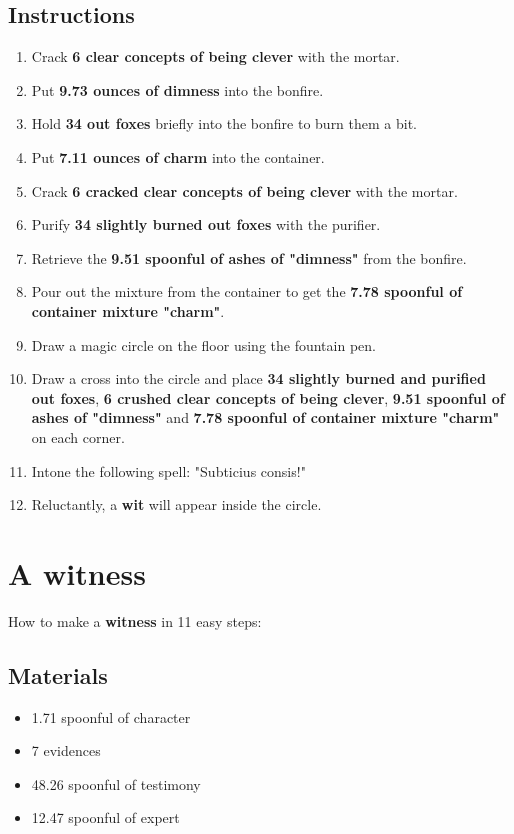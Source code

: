 \documentclass{article}
\begin{document}
\subsection{Instructions}\begin{enumerate}
\item 
Crack \textbf{6 clear concepts of being clever} with the mortar.
\item 
Put \textbf{9.73 ounces of dimness} into the bonfire.
\item 
Hold \textbf{34 out foxes} briefly into the bonfire to burn them a bit.
\item 
Put \textbf{7.11 ounces of charm} into the container.
\item 
Crack \textbf{6 cracked clear concepts of being clever} with the mortar.
\item 
Purify \textbf{34 slightly burned out foxes} with the purifier.
\item 
Retrieve the \textbf{9.51 spoonful of ashes of "dimness"} from the bonfire.
\item 
Pour out the mixture from the container to get the \textbf{7.78 spoonful of container mixture "charm"}.
\item 
Draw a magic circle on the floor using the fountain pen.
\item 
Draw a cross into the circle and place \textbf{34 slightly burned and purified out foxes}, \textbf{6 crushed clear concepts of being clever}, \textbf{9.51 spoonful of ashes of "dimness"} and \textbf{7.78 spoonful of container mixture "charm"} on each corner.
\item 
Intone the following spell: "Subticius consis!"
\item 
Reluctantly, a \textbf{wit} will appear inside the circle.
\end{enumerate}
\newpage
\section{A witness}How to make a \textbf{witness} in 11 easy steps:

\subsection{Materials}\begin{itemize}
\item 
1.71 spoonful of character
\item 
7 evidences
\item 
48.26 spoonful of testimony
\item 
12.47 spoonful of expert
\end{itemize}
\end{document}
